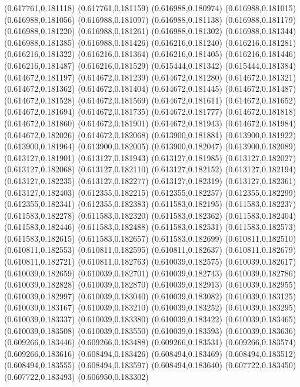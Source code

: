 (0.617761,0.181118)
(0.617761,0.181159)
(0.616988,0.180974)
(0.616988,0.181015)
(0.616988,0.181056)
(0.616988,0.181097)
(0.616988,0.181138)
(0.616988,0.181179)
(0.616988,0.181220)
(0.616988,0.181261)
(0.616988,0.181302)
(0.616988,0.181344)
(0.616988,0.181385)
(0.616988,0.181426)
(0.616216,0.181240)
(0.616216,0.181281)
(0.616216,0.181322)
(0.616216,0.181364)
(0.616216,0.181405)
(0.616216,0.181446)
(0.616216,0.181487)
(0.616216,0.181529)
(0.615444,0.181342)
(0.615444,0.181384)
(0.614672,0.181197)
(0.614672,0.181239)
(0.614672,0.181280)
(0.614672,0.181321)
(0.614672,0.181362)
(0.614672,0.181404)
(0.614672,0.181445)
(0.614672,0.181487)
(0.614672,0.181528)
(0.614672,0.181569)
(0.614672,0.181611)
(0.614672,0.181652)
(0.614672,0.181694)
(0.614672,0.181735)
(0.614672,0.181777)
(0.614672,0.181818)
(0.614672,0.181860)
(0.614672,0.181901)
(0.614672,0.181943)
(0.614672,0.181984)
(0.614672,0.182026)
(0.614672,0.182068)
(0.613900,0.181881)
(0.613900,0.181922)
(0.613900,0.181964)
(0.613900,0.182005)
(0.613900,0.182047)
(0.613900,0.182089)
(0.613127,0.181901)
(0.613127,0.181943)
(0.613127,0.181985)
(0.613127,0.182027)
(0.613127,0.182068)
(0.613127,0.182110)
(0.613127,0.182152)
(0.613127,0.182194)
(0.613127,0.182235)
(0.613127,0.182277)
(0.613127,0.182319)
(0.613127,0.182361)
(0.613127,0.182403)
(0.612355,0.182215)
(0.612355,0.182257)
(0.612355,0.182299)
(0.612355,0.182341)
(0.612355,0.182383)
(0.611583,0.182195)
(0.611583,0.182237)
(0.611583,0.182278)
(0.611583,0.182320)
(0.611583,0.182362)
(0.611583,0.182404)
(0.611583,0.182446)
(0.611583,0.182488)
(0.611583,0.182531)
(0.611583,0.182573)
(0.611583,0.182615)
(0.611583,0.182657)
(0.611583,0.182699)
(0.610811,0.182510)
(0.610811,0.182553)
(0.610811,0.182595)
(0.610811,0.182637)
(0.610811,0.182679)
(0.610811,0.182721)
(0.610811,0.182763)
(0.610039,0.182575)
(0.610039,0.182617)
(0.610039,0.182659)
(0.610039,0.182701)
(0.610039,0.182743)
(0.610039,0.182786)
(0.610039,0.182828)
(0.610039,0.182870)
(0.610039,0.182913)
(0.610039,0.182955)
(0.610039,0.182997)
(0.610039,0.183040)
(0.610039,0.183082)
(0.610039,0.183125)
(0.610039,0.183167)
(0.610039,0.183210)
(0.610039,0.183252)
(0.610039,0.183295)
(0.610039,0.183337)
(0.610039,0.183380)
(0.610039,0.183422)
(0.610039,0.183465)
(0.610039,0.183508)
(0.610039,0.183550)
(0.610039,0.183593)
(0.610039,0.183636)
(0.609266,0.183446)
(0.609266,0.183488)
(0.609266,0.183531)
(0.609266,0.183574)
(0.609266,0.183616)
(0.608494,0.183426)
(0.608494,0.183469)
(0.608494,0.183512)
(0.608494,0.183555)
(0.608494,0.183597)
(0.608494,0.183640)
(0.607722,0.183450)
(0.607722,0.183493)
(0.606950,0.183302)
